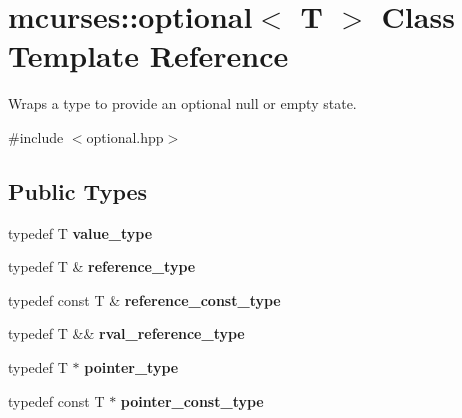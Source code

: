 \hypertarget{classmcurses_1_1optional}{}\section{mcurses\+:\+:optional$<$ T $>$ Class Template Reference}
\label{classmcurses_1_1optional}


Wraps a type to provide an optional \textquotesingle{}null\textquotesingle{} or empty state.  




{\ttfamily \#include $<$optional.\+hpp$>$}

\subsection*{Public Types}
\begin{DoxyCompactItemize}
\item 
\hypertarget{classmcurses_1_1optional_a73fd96cc945d20d546fe3f8d8cbd1a25}{}\label{classmcurses_1_1optional_a73fd96cc945d20d546fe3f8d8cbd1a25} 
typedef T {\bfseries value\+\_\+type}
\item 
\hypertarget{classmcurses_1_1optional_ace43a2dff3f04c99a85cbc7545547f3f}{}\label{classmcurses_1_1optional_ace43a2dff3f04c99a85cbc7545547f3f} 
typedef T \& {\bfseries reference\+\_\+type}
\item 
\hypertarget{classmcurses_1_1optional_a67b19d29a91d7a1bd31bfdf2dc4cec1a}{}\label{classmcurses_1_1optional_a67b19d29a91d7a1bd31bfdf2dc4cec1a} 
typedef const T \& {\bfseries reference\+\_\+const\+\_\+type}
\item 
\hypertarget{classmcurses_1_1optional_aa2f9a50572a42c02c6c06ee9b8eef286}{}\label{classmcurses_1_1optional_aa2f9a50572a42c02c6c06ee9b8eef286} 
typedef T \&\& {\bfseries rval\+\_\+reference\+\_\+type}
\item 
\hypertarget{classmcurses_1_1optional_a5489fe0c966870126817af1789d6f143}{}\label{classmcurses_1_1optional_a5489fe0c966870126817af1789d6f143} 
typedef T $\ast$ {\bfseries pointer\+\_\+type}
\item 
\hypertarget{classmcurses_1_1optional_a0e99aac87406a6a2706926b3dd528f20}{}\label{classmcurses_1_1optional_a0e99aac87406a6a2706926b3dd528f20} 
typedef const T $\ast$ {\bfseries pointer\+\_\+const\+\_\+type}
\end{DoxyCompactItemize}
